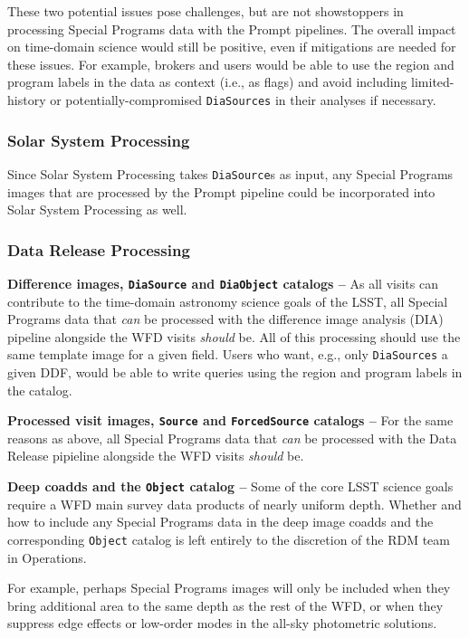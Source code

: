 These two potential issues pose challenges, but are not showstoppers in processing 
Special Programs data with the Prompt pipelines. 
The overall impact on time-domain science would still be positive, even 
if mitigations are needed for these issues.
For example, brokers and users would be able to use the region and program labels
in the data as context (i.e., as flags) and avoid including 
limited-history or potentially-compromised {\tt DiaSources} in their
analyses if necessary.

\subsubsection{Solar System Processing}\label{sssec:proc_reg_ss}

Since Solar System Processing takes {\tt DiaSource}s as input, any 
Special Programs images that are processed by the Prompt pipeline
could be incorporated into Solar System Processing as well.

\subsubsection{Data Release Processing}\label{sssec:proc_reg_dr}

\textbf{Difference images, {\tt DiaSource} and {\tt DiaObject} catalogs -- }
As all visits can contribute to the time-domain astronomy science goals 
of the LSST, all Special Programs data that {\it can} be processed with 
the difference image analysis (DIA) pipeline alongside the WFD visits 
{\it should} be.
All of this processing should use the same template image for a given
field.
Users who want, e.g., only {\tt DiaSources} a given DDF, would be 
able to write queries using the region and program labels in the catalog.

\textbf{Processed visit images, {\tt Source} and {\tt ForcedSource} catalogs -- }
For the same reasons as above, all Special Programs data that 
{\it can} be processed with the Data Release pipieline alongside the WFD 
visits {\it should} be.

\textbf{Deep coadds and the {\tt Object} catalog -- }
Some of the core LSST science goals require a WFD main survey data 
products of nearly uniform depth.
Whether and how to include any Special Programs data in the deep image 
coadds and the corresponding {\tt Object} catalog is left entirely to the 
discretion of the RDM team in Operations.

For example, perhaps Special Programs images will only be included when 
they bring additional area to the same depth as the rest of the WFD, or 
when they suppress edge effects or low-order modes in the 
all-sky photometric solutions.

